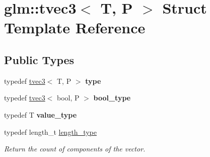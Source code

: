 \hypertarget{structglm_1_1tvec3}{\section{glm\-:\-:tvec3$<$ T, P $>$ Struct Template Reference}
\label{structglm_1_1tvec3}
}
\subsection*{Public Types}
\begin{DoxyCompactItemize}
\item 
\hypertarget{structglm_1_1tvec3_ac2fe9ecb34ed8919d08879311ec74b8a}{typedef \hyperlink{structglm_1_1tvec3}{tvec3}$<$ T, P $>$ {\bfseries type}}\label{structglm_1_1tvec3_ac2fe9ecb34ed8919d08879311ec74b8a}

\item 
\hypertarget{structglm_1_1tvec3_a7d83af99df8b5a51688967cd08789917}{typedef \hyperlink{structglm_1_1tvec3}{tvec3}$<$ bool, P $>$ {\bfseries bool\-\_\-type}}\label{structglm_1_1tvec3_a7d83af99df8b5a51688967cd08789917}

\item 
\hypertarget{structglm_1_1tvec3_a9831435e7980f26529de581ad8fed6f0}{typedef T {\bfseries value\-\_\-type}}\label{structglm_1_1tvec3_a9831435e7980f26529de581ad8fed6f0}

\item 
\hypertarget{structglm_1_1tvec3_a3a79c6a1cfc9fb8821a0a878fa2de91a}{typedef length\-\_\-t \hyperlink{structglm_1_1tvec3_a3a79c6a1cfc9fb8821a0a878fa2de91a}{length\-\_\-type}}\label{structglm_1_1tvec3_a3a79c6a1cfc9fb8821a0a878fa2de91a}

\begin{DoxyCompactList}\small\item\em Return the count of components of the vector. \end{DoxyCompactList}\end{DoxyCompactItemize}
